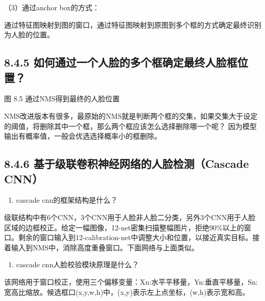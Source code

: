 （3）通过anchor box的方式：

​
通过特征图映射到图的窗口，通过特征图映射到原图到多个框的方式确定最终识别为人脸的位置。

\subsection{8.4.5
如何通过一个人脸的多个框确定最终人脸框位置？}\label{ux5982ux4f55ux901aux8fc7ux4e00ux4e2aux4ebaux8138ux7684ux591aux4e2aux6846ux786eux5b9aux6700ux7ec8ux4ebaux8138ux6846ux4f4dux7f6e}

\begin{figure}
\centering
\caption{}
\end{figure}

图 8.5 通过NMS得到最终的人脸位置

NMS改进版本有很多，最原始的NMS就是判断两个框的交集，如果交集大于设定的阈值，将删除其中一个框，那么两个框应该怎么选择删除哪一个呢？
因为模型输出有概率值，一般会优选选择概率小的框删除。

\subsection{8.4.6 基于级联卷积神经网络的人脸检测（Cascade
CNN）}\label{ux57faux4e8eux7ea7ux8054ux5377ux79efux795eux7ecfux7f51ux7edcux7684ux4ebaux8138ux68c0ux6d4bcascade-cnn}

\begin{enumerate}
\def\labelenumi{\arabic{enumi}.}
\item
  cascade cnn的框架结构是什么？
\end{enumerate}

\begin{figure}
\centering
\caption{}
\end{figure}

级联结构中有6个CNN，3个CNN用于人脸非人脸二分类，另外3个CNN用于人脸区域的边框校正。给定一幅图像，12-net密集扫描整幅图片，拒绝90\%以上的窗口。剩余的窗口输入到12-calibration-net中调整大小和位置，以接近真实目标。接着输入到NMS中，消除高度重叠窗口。下面网络与上面类似。

\begin{enumerate}
\def\labelenumi{\arabic{enumi}.}
\setcounter{enumi}{1}
\item
  cascade cnn人脸校验模块原理是什么？
\end{enumerate}

该网络用于窗口校正，使用三个偏移变量：Xn:水平平移量，Yn:垂直平移量，Sn:宽高比缩放。候选框口(x,y,w,h)中，(x,y)表示左上点坐标，(w,h)表示宽和高。

